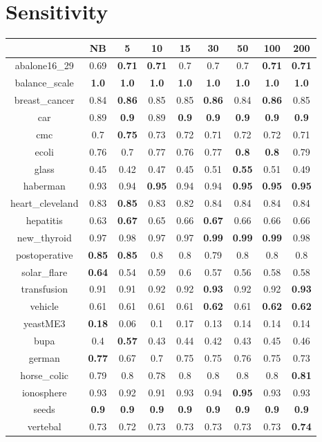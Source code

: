 \documentclass{article}%
\begin{document}
%
\section*{Sensitivity}%
\begin{tabular}{c|cccccccc}%
\hline%
&NB&5&10&15&30&50&100&200\\%
\hline%
abalone16\_29&0.69&\textbf{0.71}&\textbf{0.71}&0.7&0.7&0.7&\textbf{0.71}&\textbf{0.71}\\%
\hline%
balance\_scale&\textbf{1.0}&\textbf{1.0}&\textbf{1.0}&\textbf{1.0}&\textbf{1.0}&\textbf{1.0}&\textbf{1.0}&\textbf{1.0}\\%
\hline%
breast\_cancer&0.84&\textbf{0.86}&0.85&0.85&\textbf{0.86}&0.84&\textbf{0.86}&0.85\\%
\hline%
car&0.89&\textbf{0.9}&0.89&\textbf{0.9}&\textbf{0.9}&\textbf{0.9}&\textbf{0.9}&\textbf{0.9}\\%
\hline%
cmc&0.7&\textbf{0.75}&0.73&0.72&0.71&0.72&0.72&0.71\\%
\hline%
ecoli&0.76&0.7&0.77&0.76&0.77&\textbf{0.8}&\textbf{0.8}&0.79\\%
\hline%
glass&0.45&0.42&0.47&0.45&0.51&\textbf{0.55}&0.51&0.49\\%
\hline%
haberman&0.93&0.94&\textbf{0.95}&0.94&0.94&\textbf{0.95}&\textbf{0.95}&\textbf{0.95}\\%
\hline%
heart\_cleveland&0.83&\textbf{0.85}&0.83&0.82&0.84&0.84&0.84&0.84\\%
\hline%
hepatitis&0.63&\textbf{0.67}&0.65&0.66&\textbf{0.67}&0.66&0.66&0.66\\%
\hline%
new\_thyroid&0.97&0.98&0.97&0.97&\textbf{0.99}&\textbf{0.99}&\textbf{0.99}&0.98\\%
\hline%
postoperative&\textbf{0.85}&\textbf{0.85}&0.8&0.8&0.79&0.8&0.8&0.8\\%
\hline%
solar\_flare&\textbf{0.64}&0.54&0.59&0.6&0.57&0.56&0.58&0.58\\%
\hline%
transfusion&0.91&0.91&0.92&0.92&\textbf{0.93}&0.92&0.92&\textbf{0.93}\\%
\hline%
vehicle&0.61&0.61&0.61&0.61&\textbf{0.62}&0.61&\textbf{0.62}&\textbf{0.62}\\%
\hline%
yeastME3&\textbf{0.18}&0.06&0.1&0.17&0.13&0.14&0.14&0.14\\%
\hline%
bupa&0.4&\textbf{0.57}&0.43&0.44&0.42&0.43&0.45&0.46\\%
\hline%
german&\textbf{0.77}&0.67&0.7&0.75&0.75&0.76&0.75&0.73\\%
\hline%
horse\_colic&0.79&0.8&0.78&0.8&0.8&0.8&0.8&\textbf{0.81}\\%
\hline%
ionosphere&0.93&0.92&0.91&0.93&0.94&\textbf{0.95}&0.93&0.93\\%
\hline%
seeds&\textbf{0.9}&\textbf{0.9}&\textbf{0.9}&\textbf{0.9}&\textbf{0.9}&\textbf{0.9}&\textbf{0.9}&\textbf{0.9}\\%
\hline%
vertebal&0.73&0.72&0.73&0.73&0.73&0.73&0.73&\textbf{0.74}\\%
\hline%
\end{tabular}
\end{document}
